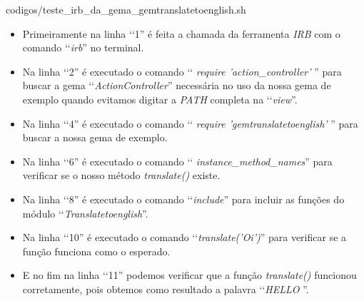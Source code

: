 
{codigos/teste_irb_da_gema_gemtranslatetoenglish.sh}

\begin{itemize}

 \item Primeiramente na linha ‘‘1'' é feita a chamada da ferramenta \emph{IRB} com o comando ‘‘\emph{irb}'' 
  no terminal.
  
  \item Na linha ‘‘2'' é executado o comando ‘‘ \emph{require 'action\_controller'} '' para buscar a gema 
  ‘‘\emph{ActionController}'' necessária no uso da nossa gema de exemplo quando evitamos digitar a 
  \emph{PATH} completa na ‘‘\emph{view}''.

  \item Na linha ‘‘4'' é executado o comando ‘‘ \emph{require 'gemtranslatetoenglish'} '' para buscar a 
  nossa gema de exemplo.
  
  \item Na linha ‘‘6'' é executado o comando 
  ‘‘ \emph{instance\_method\_names}'' para verificar se o nosso método \emph{translate()} existe.
  
  \item Na linha ‘‘8'' é executado o comando ‘‘\emph{include}'' para incluir as funções do módulo 
  ‘‘\emph{Translatetoenglish}''.
  
  \item Na linha ‘‘10'' é executado o comando 
  ‘‘\emph{translate('Oi')}'' para verificar se a função funciona como o esperado.
  
  \item E no fim na linha ‘‘11'' podemos verificar que a função \emph{translate()} funcionou corretamente,
  pois obtemos como resultado a palavra ‘‘\emph{HELLO }''.
  
 \end{itemize}